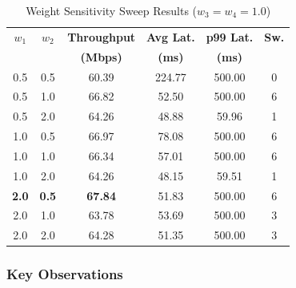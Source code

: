 \documentclass[conference,10pt]{IEEEtran}
\begin{document}
\begin{table}[htbp]
\caption{Weight Sensitivity Sweep Results ($w_3 = w_4 = 1.0$)}
\label{tab:sweep}
\centering
\begin{tabular}{@{}cccccc@{}}
\toprule
$w_1$ & $w_2$ & \textbf{Throughput} & \textbf{Avg Lat.} & \textbf{p99 Lat.} & \textbf{Sw.} \\
 & & \textbf{(Mbps)} & \textbf{(ms)} & \textbf{(ms)} & \\
\midrule
0.5 & 0.5 & 60.39 & 224.77 & 500.00 & 0 \\
0.5 & 1.0 & 66.82 & 52.50 & 500.00 & 6 \\
0.5 & 2.0 & 64.26 & 48.88 & 59.96 & 1 \\
1.0 & 0.5 & 66.97 & 78.08 & 500.00 & 6 \\
1.0 & 1.0 & 66.34 & 57.01 & 500.00 & 6 \\
1.0 & 2.0 & 64.26 & 48.15 & 59.51 & 1 \\
\textbf{2.0} & \textbf{0.5} & \textbf{67.84} & 51.83 & 500.00 & 6 \\
2.0 & 1.0 & 63.78 & 53.69 & 500.00 & 3 \\
2.0 & 2.0 & 64.28 & 51.35 & 500.00 & 3 \\
\bottomrule
\end{tabular}
\end{table}

\subsubsection{Key Observations}
\end{document}

